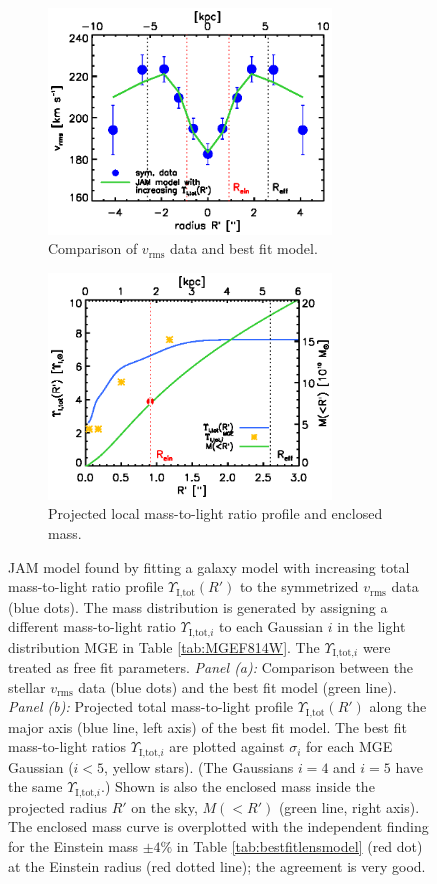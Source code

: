 \documentclass[useAMS,usenatbib]{mnras}
\begin{document}
\begin{figure}
\centering
\begin{subfigure}{.5\textwidth}
  \centering
  \includegraphics[height=6cm]{fig/jam_G_vrms.ps}
  \caption{Comparison of $v_\text{rms}$ data and best fit model.}
  \label{fig:JAM_modelG}
\end{subfigure}%
\begin{subfigure}{.5\textwidth}
  \centering
  \includegraphics[height=6cm]{fig/jam_G_enclMass.ps}
  \caption{Projected local mass-to-light ratio profile and enclosed mass.}
  \label{fig:enclMass_modelG}
\end{subfigure}
\caption{JAM model found by fitting a galaxy model with increasing total mass-to-light ratio profile $\Upsilon_\text{I,tot}(R')$ to the symmetrized $v_\text{rms}$ data (blue dots). The mass distribution is generated by assigning a different mass-to-light ratio $\Upsilon_{\text{I,tot,}i}$ to each Gaussian $i$ in the light distribution MGE in Table \ref{tab:MGEF814W}. The $\Upsilon_{\text{I,tot,}i}$ were treated as free fit parameters. \emph{Panel (a):} Comparison between the stellar $v_\text{rms}$ data (blue dots) and the best fit model (green line). \emph{Panel (b):} Projected total mass-to-light profile $\Upsilon_\text{I,tot}(R')$ along the major axis (blue line, left axis) of the best fit model. The best fit mass-to-light ratios $\Upsilon_{\text{I,tot,}i}$ are plotted against $\sigma_i$ for each MGE Gaussian ($i<5$, yellow stars). (The Gaussians $i=4$ and $i=5$ have the same $\Upsilon_{\text{I,tot,}i}$.) Shown is also the enclosed mass inside the projected radius $R'$ on the sky, $M(<R')$ (green line, right axis). The enclosed mass curve is overplotted with the independent finding for the Einstein mass $\pm 4 \%$ in Table \ref{tab:bestfitlensmodel} (red dot) at the Einstein radius (red dotted line); the agreement is very good.}
\label{fig:modelG}
\end{figure}
\end{document}
